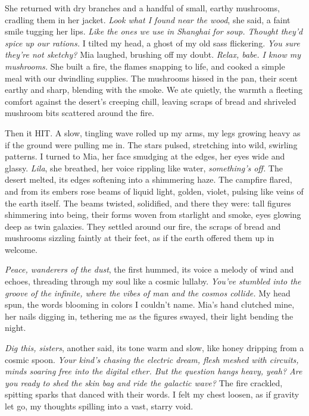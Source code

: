 \documentclass[12pt,oneside]{book} %
\begin{document}
She returned with dry branches and a handful of small, earthy mushrooms, cradling them in her jacket. \textit{Look what I found near the wood}, she said, a faint smile tugging her lips. \textit{Like the ones we use in Shanghai for soup. Thought they’d spice up our rations.} I tilted my head, a ghost of my old sass flickering. \textit{You sure they’re not sketchy?} Mia laughed, brushing off my doubt. \textit{Relax, babe. I know my mushrooms.} She built a fire, the flames snapping to life, and cooked a simple meal with our dwindling supplies. The mushrooms hissed in the pan, their scent earthy and sharp, blending with the smoke. We ate quietly, the warmth a fleeting comfort against the desert’s creeping chill, leaving scraps of bread and shriveled mushroom bits scattered around the fire.

Then it HIT. A slow, tingling wave rolled up my arms, my legs growing heavy as if the ground were pulling me in. The stars pulsed, stretching into wild, swirling patterns. I turned to Mia, her face smudging at the edges, her eyes wide and glassy. \textit{Lila}, she breathed, her voice rippling like water, \textit{something’s off.} The desert melted, its edges softening into a shimmering haze. The campfire flared, and from its embers rose beams of liquid light, golden, violet, pulsing like veins of the earth itself. The beams twisted, solidified, and there they were: tall figures shimmering into being, their forms woven from starlight and smoke, eyes glowing deep as twin galaxies. They settled around our fire, the scraps of bread and mushrooms sizzling faintly at their feet, as if the earth offered them up in welcome.

\textit{Peace, wanderers of the dust}, the first hummed, its voice a melody of wind and echoes, threading through my soul like a cosmic lullaby. \textit{You’ve stumbled into the groove of the infinite, where the vibes of man and the cosmos collide.} My head spun, the words blooming in colors I couldn’t name. Mia’s hand clutched mine, her nails digging in, tethering me as the figures swayed, their light bending the night.

\textit{Dig this, sisters}, another said, its tone warm and slow, like honey dripping from a cosmic spoon. \textit{Your kind’s chasing the electric dream, flesh meshed with circuits, minds soaring free into the digital ether. But the question hangs heavy, yeah? Are you ready to shed the skin bag and ride the galactic wave?} The fire crackled, spitting sparks that danced with their words. I felt my chest loosen, as if gravity let go, my thoughts spilling into a vast, starry void.
\end{document}
